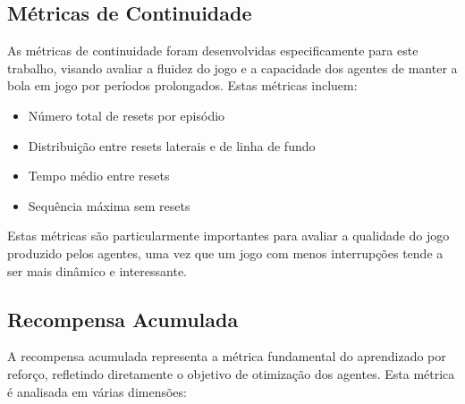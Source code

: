 \subsection{Métricas de Continuidade}

As métricas de continuidade foram desenvolvidas especificamente para este trabalho, visando avaliar a fluidez do jogo e a capacidade dos agentes de manter a bola em jogo por períodos prolongados. Estas métricas incluem:

\begin{itemize}
    \item Número total de resets por episódio
    \item Distribuição entre resets laterais e de linha de fundo
    \item Tempo médio entre resets
    \item Sequência máxima sem resets
\end{itemize}

Estas métricas são particularmente importantes para avaliar a qualidade do jogo produzido pelos agentes, uma vez que um jogo com menos interrupções tende a ser mais dinâmico e interessante.





\subsection{Recompensa Acumulada}

A recompensa acumulada representa a métrica fundamental do aprendizado por reforço, refletindo diretamente o objetivo de otimização dos agentes. Esta métrica é analisada em várias dimensões:

